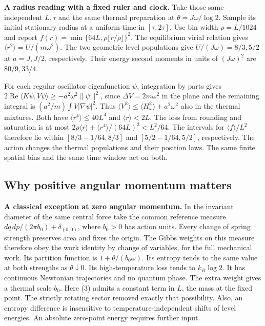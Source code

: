 \documentclass[11pt,a4paper]{article}
\begin{document}
\textbf{A radius reading with a fixed ruler and clock.} Take those same
independent \(L,\tau\) and the same thermal preparation at
\(\theta=J\omega/\log2\). Sample its initial stationary radius at a
uniform time in \([\tau,2\tau]\). Use bin width \(\rho=L/1024\) and
report \(f(r)=\min\{64L,\rho\lfloor r/\rho\rfloor\}^2\). The equilibrium
virial relation gives \(\langle r^2\rangle=U/(m\omega^2)\). The two
geometric level populations give \(U/(J\omega)=8/3,5/2\) at \(a=J,J/2\),
respectively. Their energy second moments in units of \((J\omega)^2\)
are \(80/9,33/4\).

For each regular oscillator eigenfunction \(\psi\), integration by parts
gives \(2\operatorname{Re}\langle K\psi,V\psi\rangle
\ge -a^2\omega^2\|\psi\|^2\), since \(\Delta V=2m\omega^2\) in the plane
and the remaining integral is \((a^2/m)\int V|\nabla\psi|^2\). Thus
\(\langle V^2\rangle\le\langle H_\omega^2\rangle+a^2\omega^2\) also in
the thermal mixtures. Both have \(\langle r^4\rangle\le40L^4\) and
\(\langle r\rangle<2L\). The loss from rounding and saturation is at
most \(2\rho\langle r\rangle+\langle r^4\rangle/(64L)^2<L^2/64\). The
intervals for \(\langle f\rangle/L^2\) therefore lie within
\([8/3-1/64,8/3]\) and \([5/2-1/64,5/2]\), respectively. The action
changes the thermal populations and their position laws. The same finite
spatial bins and the same time window act on both.

\subsection{Why positive angular momentum
matters}\label{why-positive-angular-momentum-matters}

\textbf{A classical exception at zero angular momentum.} In the
invariant diameter of the same central force take the common reference
measure \(dq\,dp/(2\pi b_0)+\delta_{(0,0)}\), where \(b_0>0\) has action
units. Every change of spring strength preserves area and fixes the
origin. The Gibbs weights on this measure therefore obey the work
identity by change of variables, for the full mechanical work. Its
partition function is \(1+\theta/(b_0\omega)\). Its entropy tends to the
same value at both strengths as \(\theta\downarrow0\). Its
high-temperature loss tends to \(k_B\log2\). It has continuous Newtonian
trajectories and no quantum phase. The extra weight gives a thermal
scale \(b_0\). Here (3) admits a constant term in \(L\), the mass at the
fixed point. The strictly rotating sector removed exactly that
possibility. Also, an entropy difference is insensitive to
temperature-independent shifts of level energies. An absolute zero-point
energy requires further input.
\end{document}
